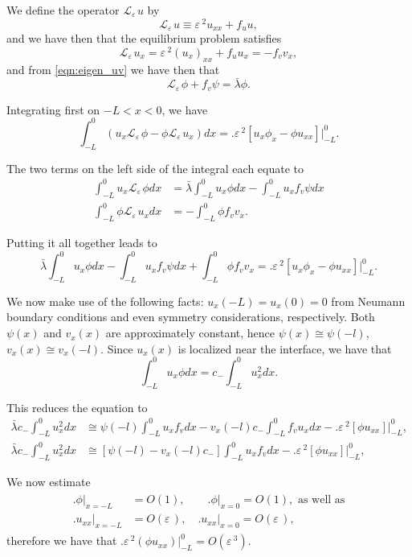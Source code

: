 \documentclass[a4paper,10pt]{article}
\newcommand{\lA}{\ensuremath{\lambda}}
\newcommand{\Ep}{\ensuremath{\varepsilon\,}}
\newcommand{\LL}{\ensuremath{\mathcal{L}}}
\begin{document}
We define the operator $\LL_{\Ep}u$ by
% 
\begin{equation*}
   \LL_{\Ep}u\equiv \Ep^2u_{xx} + f_u u,
\end{equation*}
% 
and we have then that the equilibrium problem satisfies
% 
\[
   \LL_{\Ep}u_x = \Ep^2(u_x)_{xx} + f_u u_x = -f_v v_x,
\]
% 
and from \eqref{eqn:eigen_uv} we have then that
% 
\[
   \LL_{\Ep}\phi +f_v\psi = \bar{\lA}\phi.
\]
% 

Integrating first on $-L<x<0$, we have
% 
\[
 \int_{-L}^0(u_x\LL_{\Ep}\phi - \phi\LL_{\Ep}u_x)dx = \Big.\Ep^2[u_x\phi_x-\phi u_{xx}]\Big|_{-L}^0.
\]
%  

The two terms on the left side of the integral each equate to
% 
\begin{equation*}
\begin{split}
	\int_{-L}^0u_x\LL_{\Ep}\phi dx &= \bar{\lA}\int_{-L}^0u_x\phi dx - \int_{-L}^0u_xf_v\psi dx\\
	\int_{-L}^0\phi\LL_{\Ep}u_x dx &= -\int_{-L}^0\phi f_vv_x.
\end{split}
\end{equation*}
% 

Putting it all together leads to 
% 
\[
  \bar{\lA}\int_{-L}^0u_x\phi dx - \int_{-L}^0u_xf_v\psi dx + \int_{-L}^0\phi f_vv_x = \Big.\Ep^2[u_x\phi_x-\phi u_{xx}]\Big|_{-L}^0.
\]
% 

We now make use of the following facts: $u_x(-L)=u_x(0)=0$ from Neumann boundary conditions and even symmetry considerations, respectively. Both $\psi(x)$ and $v_x(x)$ are approximately constant, hence $\psi(x)\cong \psi(-l)$, $v_x(x)\cong v_x(-l)$. Since $u_x(x)$ is localized near the interface, we have that 
% 
\[
  \int_{-L}^0u_x\phi dx = c_-\int_{-L}^0u_x^2dx.
\]
% 

This reduces the equation to
% 
\begin{equation*}
\begin{split}
	\bar{\lA}c_-\int_{-L}^0u_x^2 dx &\cong \psi(-l)\int_{-L}^0u_xf_vdx - v_x(-l)c_-\int_{-L}^0f_vu_xdx - \Big.\Ep^2[\phi u_{xx}]\Big|_{-L}^0,\\
	\bar{\lA}c_-\int_{-L}^0u_x^2 dx &\cong \left[\psi(-l) - v_x(-l)c_-\right]\int_{-L}^0u_xf_vdx - \Big.\Ep^2[\phi u_{xx}]\Big|_{-L}^0,
\end{split}
\end{equation*}
% 

We now estimate 
% 
\begin{equation*}
\begin{split}
\begin{aligned}
\Big.\phi \Big|_{x=-L} &= O(1),\qquad \Big.\phi \Big|_{x=0} = O(1), \text{ as well as} \\
\Big.u_{xx} \Big|_{x=-L} &= O(\Ep), \quad\Big.u_{xx} \Big|_{x=0} = O(\Ep),
\end{aligned}
\end{split}
\end{equation*}
% 
therefore we have that $\Big.\Ep^2(\phi u_{xx})\Big|_{-L}^0 = O(\Ep^3)$.
\end{document}
